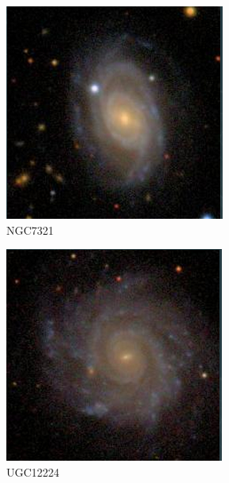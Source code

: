 \documentclass[9pt]{revtex4-1}
\begin{document}
\begin{figure}
\includegraphics[scale=0.3]{NGC7321.png}
\caption{NGC7321}
\end{figure}
\begin{figure}
\includegraphics[scale=0.3]{UGC12224.png}
\caption{UGC12224}
\end{figure}

\clearpage
\end{document}
